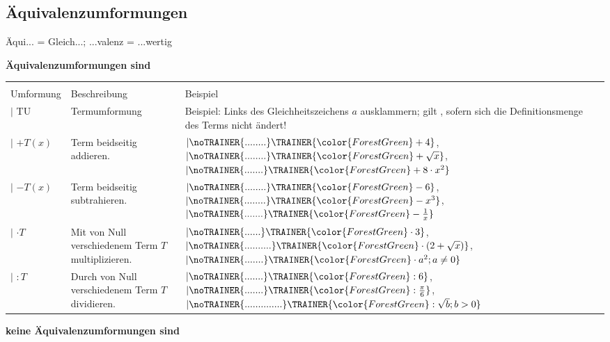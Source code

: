 \subsection{Äquivalenzumformungen}
Äqui... = Gleich...; ...valenz = ...wertig



\textbf{{\color{ForestGreen}Äquivalenzumformungen sind}}

\begin{tabular}{lp{6cm}p{8cm}}\hline\\%
Umformung   & Beschreibung  & Beispiel \\\hline
$| $ TU      & Termumformung & {\raggedright Beispiel: Links des Gleichheitszeichens $a$ ausklammern; gilt , sofern sich die Definitionsmenge des Terms nicht ändert!}\\
$| $ $+ T(x)$  & Term beidseitig addieren. & $| \noTRAINER{........}\TRAINER{\color{ForestGreen}+4}$, $| \noTRAINER{........}\TRAINER{\color{ForestGreen}+\sqrt{x}}$, $| \noTRAINER{.......}\TRAINER{\color{ForestGreen}+8\cdot{}x^2}$\\
$| $ $- T(x)$  & Term beidseitig subtrahieren. & $| \noTRAINER{........}\TRAINER{\color{ForestGreen}-6}$, $|\noTRAINER{........}\TRAINER{\color{ForestGreen}-x^3}$, $|\noTRAINER{.......}\TRAINER{\color{ForestGreen} -\frac1{x}}$\\
$| $ $\cdot{} T$  & Mit von Null verschiedenem Term $T$ multiplizieren. & $| \noTRAINER{......}\TRAINER{\color{ForestGreen}\cdot{} 3}$, $|\noTRAINER{..........}\TRAINER{\color{ForestGreen}\cdot{}(2+\sqrt{x})}$, $|\noTRAINER{.......}\TRAINER{\color{ForestGreen}\cdot{}a^2; a\ne 0}$\\
$| $ $: T$  & Durch von Null verschiedenem Term $T$ dividieren. & $| \noTRAINER{.......}\TRAINER{\color{ForestGreen}: 6}$, $|\noTRAINER{.......}\TRAINER{\color{ForestGreen}: \frac{\pi}6}$, $|\noTRAINER{..............}\TRAINER{\color{ForestGreen}:\sqrt{b}; b> 0}$\\
\end{tabular}

\textbf{\color{red} {keine} Äquivalenzumformungen sind}


